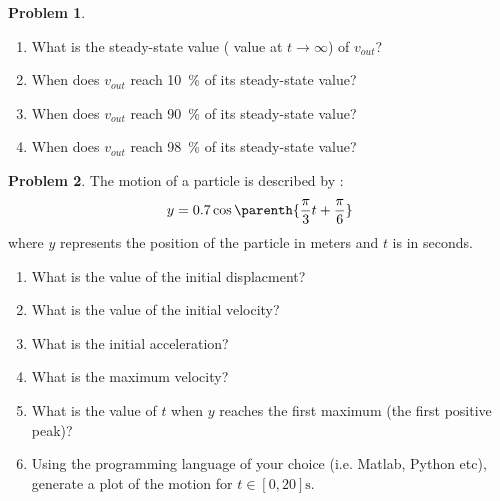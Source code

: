 \documentclass[10pt]{article}
\theoremstyle{definition}
\newtheorem{prob}{Problem}[section]
\newenvironment{subprob}%
{\renewcommand{\theenumi}{\alph{enumi}}\renewcommand{\labelenumi}{(\theenumi)}\begin{enumerate}}%
{\end{enumerate}}%
\begin{document}
\begin{prob}
\begin{subprob}
    If \( v_{out}(t) = 2 \parenth{ 1 -e^{-5 t} }\) :

    \item What is the steady-state value ( value at \( t \to \infty\)) of \( v_{out}\)?

        \vspace*{2cm}
    \item When does \( v_{out} \) reach \SI{10}{\percent} of its steady-state value?
        \vspace*{2cm}
    \item When does \( v_{out} \) reach \SI{90}{\percent} of its steady-state value?
        \vspace*{2cm}
    \item When does \( v_{out} \) reach \SI{98}{\percent} of its steady-state value?
    \end{subprob}
\end{prob}

\clearpage\newpage
\begin{prob}
    The motion of a particle is described by :
    \begin{align*}
        y = 0.7 \cos \parenth{\frac{\pi}{3}t + \frac{\pi}{6}}
    \end{align*}
    where \( y \) represents the position of the particle in meters and \( t \) is in seconds.
    
    \begin{subprob}
    \item What is the value of the initial displacment?
    \item What is the value of the initial velocity?
    \item What is the initial acceleration?
    \item What is the maximum velocity?
    \item What is the value of \( t \) when \( y \) reaches the first maximum (the first positive peak)?
    \item Using the programming language of your choice (i.e. Matlab, Python etc), generate a plot of the motion for \( t \in [0, 20] \si{\second}\).
    \end{subprob}
\end{prob}

\clearpage\newpage

\end{document}
